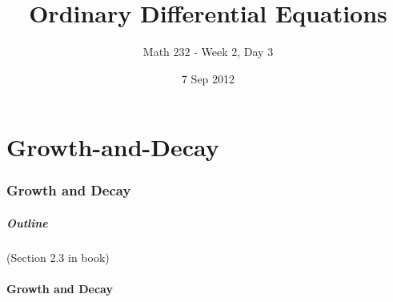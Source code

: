 \part{Growth-and-Decay}
\section{Growth and Decay}

\title{Ordinary Differential Equations}
\subtitle{Math 232 - Week 2, Day 3}
\date{7 Sep 2012}

\begin{frame}
  \titlepage
\end{frame}

\begin{frame}
  \frametitle{Outline}

  (Section 2.3 in book)
\end{frame}


\subsection{Growth and Decay}



